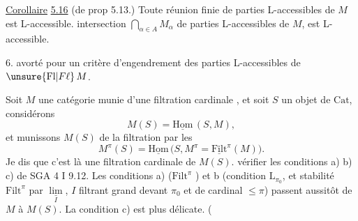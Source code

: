 \uline{Corollaire} \uline{5.16} (de prop 5.13.) Toute réunion finie de parties L-accessibles de $M$ est L-accessible.  intersection $\bigcap_{\alpha\in A}M_\alpha$ de  parties L-accessibles de $M$, est L-accessible.

6.  avorté pour un critère d'engendrement des parties L-accessibles de $\unsure{\mathrm{Fl}|F\ell}\,M$.

Soit $M$ une catégorie munie d'une filtration cardinale , et  soit $S$ un objet de $\mathrm{Cat}$, considérons
\[
 M(S)=\underline{\mathrm{Hom}}\,(S,M),
\]
et munissons $M(S)$ de la filtration par les
\[
 M^\pi(S)=\underline{\mathrm{Hom}}\,\bigl(S,M^\pi=\underline{\mathrm{Filt}}^\pi(M)\bigr).
\]
Je dis que c'est là une filtration cardinale de $M(S)$.   vérifier les conditions a) b) c) de SGA 4 I 9.12. Les conditions a) ($\mathrm{Filt}^\pi$ ) et b (condition $\mathrm{L}_{\pi_0}$, et stabilité  $\mathrm{Filt}^\pi$ par $\underset I{\underline{\lim}}$,  $I$ filtrant grand devant $\pi_0$ et de cardinal $\leq\pi$) passent aussitôt de $M$ à $M(S)$. La condition c) est plus délicate. (
